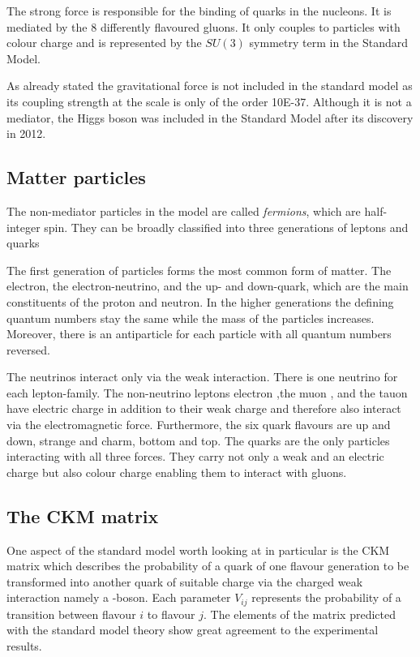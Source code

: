 The strong force is responsible for the binding of quarks in the nucleons. It is mediated by the \num{8} differently flavoured gluons. It only couples to particles with colour charge and is represented by the $SU(3)$ symmetry term in the Standard Model.

As already stated the gravitational force is not included in the standard model as its coupling strength at the scale is only of the order \num{10E-37}. Although it is not a mediator, the Higgs boson was included in the Standard Model after its discovery in 2012.

\subsection{Matter particles}

The non-mediator particles in the model are called \emph{fermions}, which are half-integer spin. They can be broadly classified into three generations of leptons and quarks

The first generation of particles forms the most common form of matter. The electron, the electron-neutrino, and the up- and down-quark, which are the main constituents of the proton and neutron.
In the higher generations the defining quantum numbers stay the same while the mass of the particles increases.
Moreover, there is an antiparticle for each particle with all quantum numbers reversed.

The neutrinos interact only via the weak interaction. There is one neutrino for each lepton-family.
The non-neutrino leptons electron \Pelectron,the muon \Pmu , and the tauon \Ptau have electric charge in addition to their weak charge and therefore also interact via the electromagnetic force.
Furthermore, the six quark flavours are up and down, strange and charm, bottom and top.
The quarks are the only particles interacting with all three forces. They carry not only a weak and an electric charge but also colour charge enabling them to interact with gluons.


\subsection{The CKM matrix}

One aspect of the standard model worth looking at in particular is the CKM matrix which describes the probability of a quark of one flavour generation to be transformed into another quark of suitable charge via the charged weak interaction namely a \PW-boson.
Each parameter $V_{ij}$ represents the probability of a transition between flavour $i$ to flavour $j$. The elements of the matrix predicted with the standard model theory show great agreement to the experimental results.~\cite{pdg}

